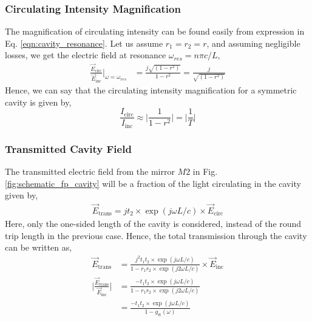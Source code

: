 \documentclass{Resources/cquicc}
\begin{document}
\subsubsection{Circulating Intensity Magnification} 
The magnification of circulating intensity can be found easily from expression in Eq. \ref{eqn:cavity_resonance}. Let us assume $r_1 = r_2 = r$, and assuming negligible losses, we get the electric field at resonance $\omega_{res} = n\pi c/L$,
\begin{equation}
    \begin{split}
            \frac{\vec{E}_{\text{circ}}}{\vec{E}_{\text{inc}}}\Bigg|_{\omega = \omega_{res}} & = \frac{j\sqrt{(1-r^2)}}{1-r^2} = \frac{j}{\sqrt{(1-r^2)}} 
    \end{split}
\end{equation}
Hence, we can say that the circulating intensity magnification for a symmetric cavity is given by, 
\begin{equation}
\label{eqn: circulating_intensity_max}
    \frac{I_{\text{circ}}}{I_{\text{inc}}} \approx \Bigg| \frac{1}{1-r^2} \Bigg | = \Bigg| \frac{1}{T} \Bigg |  
\end{equation}
\subsubsection{Transmitted Cavity Field}
The transmitted electric field from the mirror $M2$ in Fig. \ref{fig:schematic_fp_cavity} will be a fraction of the light circulating in the cavity given by, 
\begin{equation}
    \begin{split}
        \vec{E}_{\text{trans}} = jt_2 \times \exp(j\omega L / c) \times \vec{E}_{\text{circ}}
    \end{split}
\end{equation}
Here, only the one-sided length of the cavity is considered, instead of the round trip length in the previous case. Hence, the total transmission through the cavity can be written as, 
\begin{equation}
    \begin{split}
        \vec{E}_{\text{trans}} & = \frac{j^2t_1t_2 \times \exp(j\omega L / c) }{1-r_1r_2\times \exp(j2\omega L/c)} \times{\vec{E}_{\text{inc}}} \\
        \Bigg | \frac{\vec{E}_{\text{trans}}}{{\vec{E}_{\text{inc}}}} \Bigg| & = \frac{-t_1t_2 \times \exp(j\omega L / c) }{1-r_1r_2\times \exp(j2\omega L/c)} \\
        & = \frac{-t_1t_2 \times \exp(j\omega L / c) }{1-g_{\text{rt}}(\omega)}
    \end{split}
\end{equation}
\end{document}
